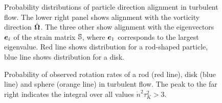 \documentclass[thesis.tex]{subfiles}
\begin{document}
\begin{figure}
\caption{ Probability distributions of particle direction alignment in turbulent flow. The lower right panel shows alignment with the vorticity direction $\hat{\mbox{\boldmath$\Omega$}}$. The three other show alignment with the eigenvectors $\mbox{\boldmath$e$}_i$ of the strain matrix $\mathbb{S}$, where $\mbox{\boldmath$e$}_1$ corresponds to the largest eigenvalue. Red line shows distribution for a rod-shaped particle, blue line shows distribution for a disk.}%
\end{figure}

\begin{figure}
	\begin{center}
\end{center}
\caption{ Probability of observed rotation rates of a rod (red line), disk (blue line) and sphere (orange line) in turbulent flow. The peak to the far right indicates the integral over all values $\dot n^2\tau^2_{K}>3$.}%
\end{figure}
\end{document}
